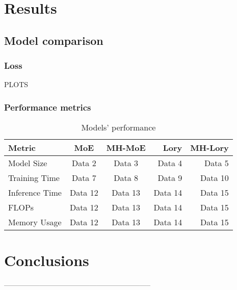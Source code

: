 \documentclass[12pt]{article}
\begin{document}
\section{Results}

\subsection{Model comparison}
\subsubsection{Loss}
 PLOTS
\subsubsection{Performance metrics}

\begin{table}[h!]
\centering
\begin{tabular}{|l|c|c|r|r|}
\hline
Metric & \textbf{MoE} & \textbf{MH-MoE} & \textbf{Lory} & \textbf{MH-Lory} \\
\hline
Model Size & Data 2 & Data 3 & Data 4 & Data 5 \\
Training Time & Data 7 & Data 8 & Data 9 & Data 10 \\
Inference Time  & Data 12 & Data 13 & Data 14 & Data 15 \\
FLOPs & Data 12 & Data 13 & Data 14 & Data 15 \\
Memory Usage & Data 12 & Data 13 & Data 14 & Data 15 \\

\hline
\end{tabular}
\caption{Models' performance}
\label{tab:performance_table}
\end{table}

\section{Conclusions}



%


\printbibliography 
% 
--------------------------------------------------------------
 
\end{document}
